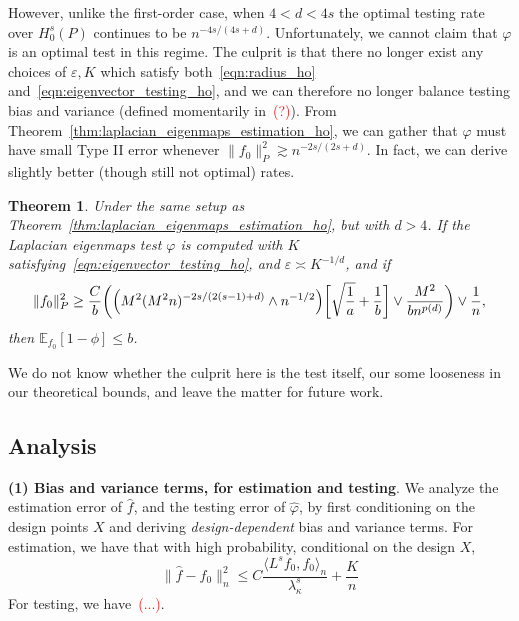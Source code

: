 \documentclass{article}
\newcommand{\1}{\mathbf{1}}
\newcommand{\Ebb}{\mathbb{E}}
\newcommand{\dotp}[2]{\langle #1, #2 \rangle}
\newcommand{\wh}[1]{\widehat{#1}}
\theoremstyle{alden}
\theoremstyle{aldenthm}
\newtheorem{theorem}{Theorem}
\theoremstyle{definition}
\theoremstyle{remark}
\begin{document}
However, unlike the first-order case, when $4 < d < 4s$ the optimal testing rate over $H_0^s(P)$ continues to be $n^{-4s/(4s + d)}$. Unfortunately, we cannot claim that $\varphi$ is an optimal test in this regime. The culprit is that there no longer exist any choices of $\varepsilon,K$ which satisfy both~\eqref{eqn:radius_ho} and~\eqref{eqn:eigenvector_testing_ho}, and we can therefore no longer balance testing bias and variance (defined momentarily in~\textcolor{red}{(?)}). From Theorem~\ref{thm:laplacian_eigenmaps_estimation_ho}, we can gather that $\varphi$ must have small Type II error whenever $\|f_0\|_P^2 \gtrsim n^{-2s/(2s + d)}$. In fact, we can derive slightly better (though still not optimal) rates.
\begin{theorem}
	\label{thm:laplacian_eigenmaps_testing_ho_suboptimal}
	Under the same setup as Theorem~\ref{thm:laplacian_eigenmaps_estimation_ho}, but with $d > 4$. If the Laplacian eigenmaps test $\varphi$ is computed with $K$ satisfying~\eqref{eqn:eigenvector_testing_ho}, and $\varepsilon \asymp K^{-1/d}$, and if 
	\begin{equation}
	\label{eqn:laplacian_eigenmaps_testing_criticalradius_ho_suboptimal}
	\|f_0\|_P^2 \geq \frac{C}{b}\biggl(\Bigl(M^2(M^2n)^{-2s/(2(s - 1) + d) } \wedge n^{-1/2}\Bigr)\biggl[\sqrt{\frac{1}{a}} + \frac{1}{b}\biggr] \vee \frac{M^2}{b n^{p(d)}} \biggr) \vee \frac{1}{n},
	\end{equation}
	then $\Ebb_{f_0}[1 - \phi] \leq b$.
\end{theorem}
We do not know whether the culprit here is the test itself, our some looseness in our theoretical bounds, and leave the matter for future work.

\subsection{Analysis}
\label{subsec:analysis}

\textbf{(1) Bias and variance terms, for estimation and testing}. We analyze the estimation error of $\wh{f}$, and the testing error of $\wh{\varphi}$, by first conditioning on the design points $X$ and deriving \emph{design-dependent} bias and variance terms. For estimation, we have that with high probability, conditional on the design $X$,
\begin{equation*}
\|\wh{f} - f_0\|_n^2 \leq C\frac{\dotp{L^s f_0}{f_0}_n}{\lambda_{\kappa}^s} + \frac{K}{n}
\end{equation*}
For testing, we have~\textcolor{red}{(...)}.
\end{document}
